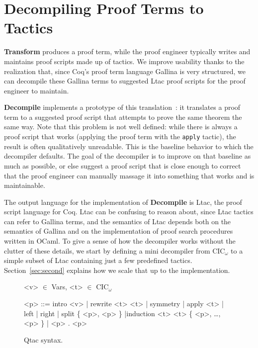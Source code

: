 \section{Decompiling Proof Terms to Tactics}
\label{sec:decompiler}

\textbf{Transform} produces a proof term,
while the proof engineer typically writes and maintains proof scripts made up of tactics.
We improve usability thanks to the realization that, since Coq's proof term language Gallina is very structured,
we can decompile these Gallina terms to suggested Ltac proof scripts for the proof engineer to maintain.


\textbf{Decompile} implements a prototype of this translation~: %
it translates a proof term to a suggested proof script that attempts to prove the same theorem the same way.
Note that this problem is not well defined: while there is always a proof script that 
works (applying the proof term with the \lstinline{apply} tactic), the result is often qualitatively unreadable.
This is the baseline behavior to which the decompiler defaults.
The goal of the decompiler is to improve on that baseline as much as possible,
or else suggest a proof script that is close enough to correct that the proof engineer can
manually massage it into something that works and is maintainable.

The output language for the implementation of \textbf{Decompile} is Ltac, the proof script language for Coq.
Ltac can be confusing to reason about, since Ltac tactics can refer to Gallina terms, and the semantics of Ltac depends both on the
semantics of Gallina and on the implementation of proof search procedures written in OCaml.
To give a sense of how the decompiler works without the clutter of these details, we start by defining a mini
decompiler from CIC$_{\omega}$ to a simple subset of Ltac containing just a few predefined tactics.
Section~\ref{sec:second} explains how we scale that up to the implementation. %

\begin{figure}
\small
\begin{grammar}
<v> $\in$ Vars, <t> $\in$ CIC$_{\omega}$

<p> ::= intro <v> |  rewrite <t> <t> | symmetry | apply <t> | left | right | split \{ <p>, <p> \} |induction <t> <t> \{ <p>, \ldots, <p> \} | <p> . <p>
\end{grammar}
\vspace{-0.3cm}
\caption{Qtac syntax.}
\label{fig:ltacsyntax1}
\end{figure}

